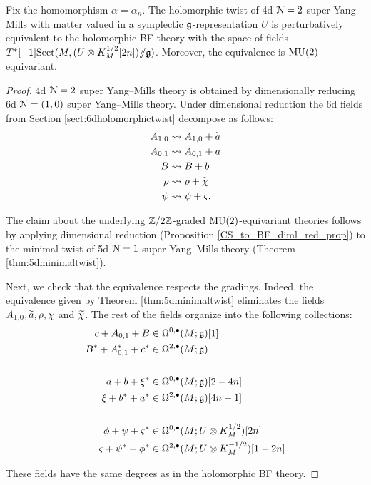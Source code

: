 \documentclass[10pt, oneside]{article}
\begin{document}
\begin{theorem}
Fix the homomorphism $\alpha = \alpha_n$. The holomorphic twist of 4d $\cN=2$ super Yang--Mills with matter valued in a symplectic $\fg$-representation $U$ is perturbatively equivalent to the holomorphic BF theory with the space of fields $T^*[-1] \Sect(M, (U\otimes K_M^{1/2}[2n])\ham \fg)$. Moreover, the equivalence is $\MU(2)$-equivariant.
\label{thm:4d2holomorphictwist}
\end{theorem}
\begin{proof}
4d $\cN=2$ super Yang--Mills theory is obtained by dimensionally reducing 6d $\cN=(1,0)$ super Yang--Mills theory. Under dimensional reduction the 6d fields from Section \ref{sect:6dholomorphictwist} decompose as follows:
\begin{align*}
A_{1, 0}&\rightsquigarrow A_{1, 0}+ \Tilde{a} \\
A_{0, 1}&\rightsquigarrow A_{0, 1}+ a \\
B&\rightsquigarrow B+ b \\
\rho&\rightsquigarrow \rho+ \Tilde{\chi} \\
\psi & \rightsquigarrow \psi+ \varsigma . \\
\end{align*}

The claim about the underlying $\ZZ/2\ZZ$-graded $\MU(2)$-equivariant theories follows by applying dimensional reduction (Proposition \ref{CS_to_BF_diml_red_prop}) to the minimal twist of 5d $\cN=1$ super Yang--Mills theory (Theorem \ref{thm:5dminimaltwist}).

Next, we check that the equivalence respects  the gradings. Indeed, the equivalence given by Theorem \ref{thm:5dminimaltwist} eliminates the fields $A_{1, 0}, \Tilde{a}, \rho, \chi$ and $\Tilde{\chi}$. The rest of the fields organize into the following collections:
\begin{align*}
c+A_{0, 1}+B&\in\Omega^{0, \bullet}(M; \fg)[1] \\
B^*+A^*_{0, 1}+ c^*&\in\Omega^{2, \bullet}(M; \fg) \\
\\
a + b + \xi^*&\in\Omega^{0, \bullet}(M; \fg)[2-4n] \\
\xi + b^* + a^*&\in\Omega^{2, \bullet}(M; \fg)[4n-1] \\
\\
\phi + \psi + \varsigma^*&\in\Omega^{0, \bullet}(M; U\otimes K_M^{1/2})[2n] \\
\varsigma + \psi^* + \phi^* &\in\Omega^{2, \bullet}(M; U\otimes K_M^{-1/2})[1-2n]
\end{align*}

These fields have the same degrees as in the holomorphic BF theory.

\end{proof}
\end{document}
